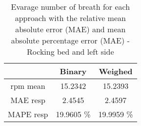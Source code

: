\begin{table}[h]
    \centering
    \begin{tabular}{|c|c|c|}
    \hline 
    & Binary & Weighed \\ 
    
    \hline 
    rpm mean & 15.2342  & 15.2393  \\
    MAE resp  &   2.4545 &  2.4597 \\ 
    MAPE resp  & 19.9605 \% & 19.9959 \%\\ 
    \hline 
\end{tabular}
\caption{Evarage number of breath for each approach with the relative mean
absolute error (MAE) and mean absolute percentage error (MAE) - Rocking bed
and left side}
\label{tab:LeftRockingMetrics}
\end{table}